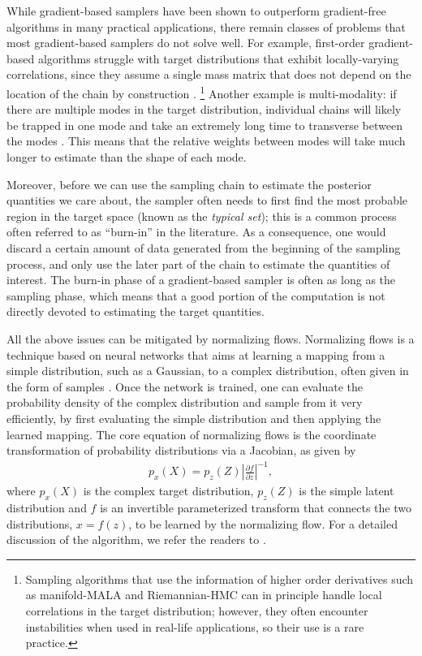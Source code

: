 \documentclass[twocolumn]{aastex631}
\begin{document}
While gradient-based samplers have been shown to outperform gradient-free
algorithms in many practical applications, there remain classes of problems that
most gradient-based samplers do not solve well. For example, first-order
gradient-based algorithms struggle with target distributions that exhibit
locally-varying correlations, since they assume a single mass matrix that does
not depend on the location of the chain by construction
\cite{2017arXiv170102434B}. \footnote{Sampling algorithms that use the
information of higher order derivatives such as manifold-MALA and Riemannian-HMC
\cite{RMHMC} can in principle handle local correlations in the target
distribution; however, they often encounter instabilities when used in real-life
applications, so their use is a rare practice.} Another example is multi-modality:
if there are multiple modes in the target distribution, individual chains will
likely be trapped in one mode and take an extremely long time to transverse
between the modes \cite{2018arXiv180803230M}.  This means that the relative
weights between modes will take much longer to estimate than the shape of each
mode.

Moreover, before we can use the sampling chain to estimate the posterior
quantities we care about, the sampler often needs to first find the most
probable region in the target space (known as the \emph{typical set}); this is
a common process often referred to as ``burn-in'' in the literature. As a
consequence, one would discard a certain amount of data generated from the
beginning of the sampling process, and only use the later part of the chain to
estimate the quantities of interest. The burn-in phase of a gradient-based
sampler is often as long as the sampling phase, which means that a good portion
of the computation is not directly devoted to estimating the target quantities.

All the above issues can be mitigated by normalizing flows.  Normalizing flows
is a technique based on neural networks that aims at learning a mapping from a
simple distribution, such as a Gaussian, to a complex distribution, often given
in the form of samples \cite{2019arXiv190809257K, 2019arXiv191202762P}. Once
the network is trained, one can evaluate the probability density of the complex
distribution and sample from it very efficiently, by first evaluating the
simple distribution and then applying the learned mapping. The core equation
of normalizing flows is the coordinate transformation of probability
distributions via a Jacobian, as given by
\begin{align}
    p_x(X) = p_z(Z) \left| \frac{\partial f}{\partial z}\right|^{-1},
\end{align}
where $p_x(X)$ is the complex target distribution, $p_z(Z)$ is the simple
latent distribution and $f$ is an invertible parameterized transform that
connects the two distributions, $x = f(z)$, to be learned by the normalizing
flow. For a detailed discussion of the algorithm, we refer the readers to
\cite{2019arXiv190809257K, 2019arXiv191202762P}.
\end{document}
